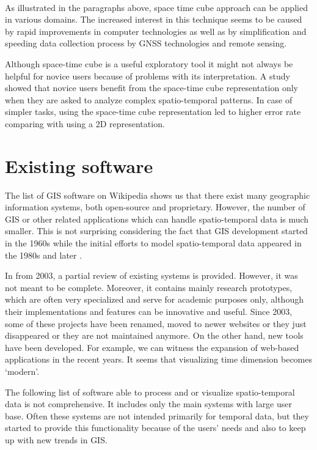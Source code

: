 \documentclass[a4paper,12pt,oneside]{book}
\begin{document}
\paragraph{}
As illustrated in the paragraphs above, space time cube approach
can be applied in various domains. The increased interest in this technique seems
to be caused by rapid improvements in computer technologies as well as by simplification and speeding
data collection process by GNSS technologies and remote sensing.

Although space-time cube is a useful exploratory tool it might not always be helpful
for novice users because of problems with its interpretation. A study \cite{kristensson2009evaluation}
showed that novice users benefit from the space-time cube representation only when they are asked to analyze
complex spatio-temporal patterns. In case of simpler tasks, using the space-time cube representation
led to higher error rate comparing with using a 2D representation.






\section{Existing software}
The list of GIS software on Wikipedia \cite{wiki:gislist}
shows us that there exist many geographic information systems,
both open-source and proprietary.
However, the number of GIS or other related applications which can handle
spatio-temporal data is much smaller.
This is not surprising considering the fact that GIS development started
in the 1960s \cite{coppock1991history} while the initial efforts to model spatio-temporal
data appeared in the 1980s and later \cite{peuquet2001}.

In \cite{andrienko2003exploratory} from 2003, a partial review of existing systems is provided.
However, it was not meant to be complete. Moreover, it contains mainly research prototypes,
which are often very specialized and serve for academic purposes only, although their implementations
and features can be innovative and useful.
Since 2003, some of these projects have been renamed,
moved to newer websites or they just disappeared or they are not maintained anymore.
On the other hand, new tools have been developed.
For example, we can witness the expansion of web-based applications in the recent years.
It seems that visualizing time dimension becomes `modern'.

The following list of software able to process and or visualize spatio-temporal data is not comprehensive.
It includes only the main systems with large user base.
Often these systems are not intended primarily for temporal data,
but they started to provide this functionality because of the users' needs
and also to keep up with new trends in GIS.
\end{document}
